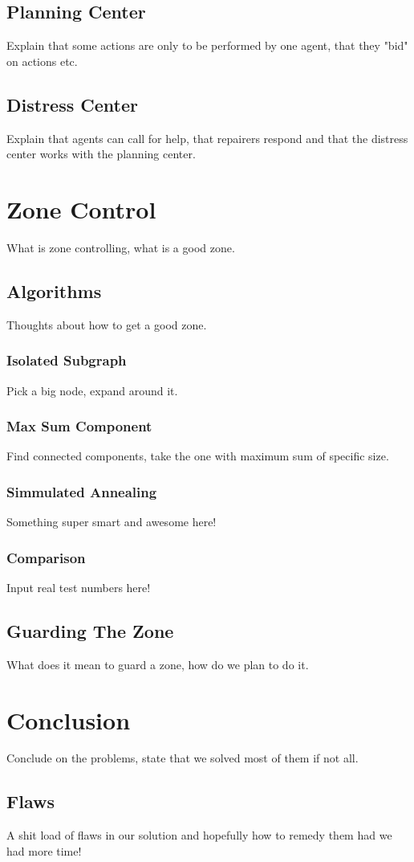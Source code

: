 \documentclass[11pt]{article}
\begin{document}
\subsection{Planning Center}
Explain that some actions are only to be performed by one agent, that they "bid" on actions etc.

\subsection{Distress Center}
Explain that agents can call for help, that repairers respond and that the distress center works with the planning center.

\section{Zone Control}
What is zone controlling, what is a good zone.

\subsection{Algorithms}
Thoughts about how to get a good zone.

\subsubsection{Isolated Subgraph}
Pick a big node, expand around it.

\subsubsection{Max Sum Component}
Find connected components, take the one with maximum sum of specific size.

\subsubsection{Simmulated Annealing}
Something super smart and awesome here!

\subsubsection{Comparison}
Input real test numbers here!

\subsection{Guarding The Zone}
What does it mean to guard a zone, how do we plan to do it.

\section{Conclusion}
Conclude on the problems, state that we solved most of them if not all.

\subsection{Flaws}
A shit load of flaws in our solution and hopefully how to remedy them had we had more time!
\end{document}
